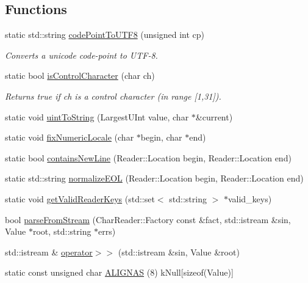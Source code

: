 \subsection*{Functions}
\begin{DoxyCompactItemize}
\item 
static std\+::string \hyperlink{namespace_json_adf0456e397a18cd7218a7b51dfc13c73}{code\+Point\+To\+U\+T\+F8} (unsigned int cp)
\begin{DoxyCompactList}\small\item\em Converts a unicode code-\/point to U\+T\+F-\/8. \end{DoxyCompactList}\item 
static bool \hyperlink{namespace_json_a0381e631737f51331065a388f4f59197}{is\+Control\+Character} (char ch)
\begin{DoxyCompactList}\small\item\em Returns true if ch is a control character (in range \mbox{[}1,31\mbox{]}). \end{DoxyCompactList}\item 
static void \hyperlink{namespace_json_ac1ffd21a9e55122014353c773ccc496e}{uint\+To\+String} (Largest\+U\+Int value, char $\ast$\&current)
\item 
static void \hyperlink{namespace_json_aa208904144dc7b11ccc28f47c9afab9a}{fix\+Numeric\+Locale} (char $\ast$begin, char $\ast$end)
\item 
static bool \hyperlink{namespace_json_a4d6ab0f651348832e5cc49b577a854d2}{contains\+New\+Line} (Reader\+::\+Location begin, Reader\+::\+Location end)
\item 
static std\+::string \hyperlink{namespace_json_a2e6b8616041876128cbef54b8c75da62}{normalize\+E\+OL} (Reader\+::\+Location begin, Reader\+::\+Location end)
\item 
static void \hyperlink{namespace_json_a8fedd83f49c9a9109d503b2b1d4824aa}{get\+Valid\+Reader\+Keys} (std\+::set$<$ std\+::string $>$ $\ast$valid\+\_\+keys)
\item 
bool \hyperlink{namespace_json_a7b90be78407a3a1f241b2a3048ef3d19}{parse\+From\+Stream} (Char\+Reader\+::\+Factory const \&fact, std\+::istream \&sin, Value $\ast$root, std\+::string $\ast$errs)
\item 
std\+::istream \& \hyperlink{namespace_json_a2434499c0c7f057890b32787c05fc4a3}{operator$>$$>$} (std\+::istream \&sin, Value \&root)
\item 
static const unsigned char \hyperlink{namespace_json_ad0638ab262fec34f995ca3d8a22c9cc4}{A\+L\+I\+G\+N\+AS} (8) k\+Null\mbox{[}sizeof(Value)\mbox{]}

\end{DoxyCompactItemize}
